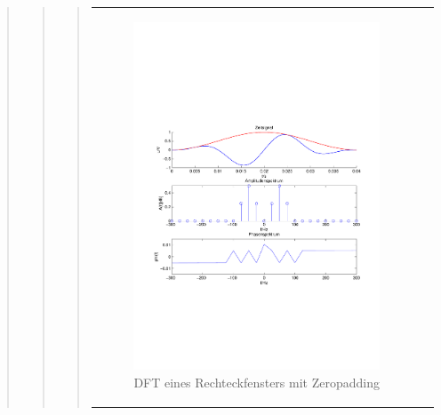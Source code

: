 \begin{quote}
\begin{quote}
\begin{quote}
\begin{center}
\begin{tabular}{ll}
                \hspace{-11em}
                    \begin{minipage}{0.6\textwidth}
    
                        \begin{figure}[H]
                            \label{fig:}
                            \includegraphics[scale=0.5,trim = 1.5cm 7cm 1.5cm 8cm, clip]{./Bilder/Hanningwindow} %
                            \caption{DFT eines Rechteckfensters mit Zeropadding}
                        \end{figure}
    
                    \end{minipage}
                    \begin{minipage}{0.6\textwidth}
    

\end{minipage}
\end{tabular}
\end{center}
\end{quote}
\end{quote}
\end{quote}

